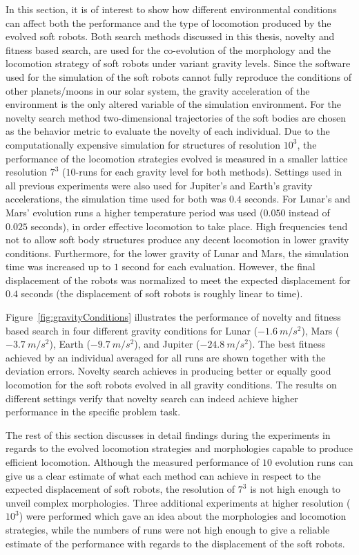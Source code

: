 In this section, it is of interest to show how different environmental conditions can affect both the performance and the type of locomotion produced by the evolved soft robots. Both search methods discussed in this thesis, novelty and fitness based search, are used for the co-evolution of the morphology and the locomotion strategy of soft robots under variant gravity levels. Since the software used for the simulation of the soft robots cannot fully reproduce the conditions of other planets/moons in our solar system, the gravity acceleration of the environment is the only altered variable of the simulation environment. For the novelty search method two-dimensional trajectories of the soft bodies are chosen as the behavior metric to evaluate the novelty of each individual. Due to the computationally expensive simulation for structures of resolution $10^3$, the performance of the locomotion strategies evolved is measured in a smaller lattice resolution $7^3$ ($10$-runs for each gravity level for both methods). Settings used in all previous experiments were also used for Jupiter's and Earth's gravity accelerations, the simulation time used for both was $0.4$ seconds. For Lunar's and Mars' evolution runs a higher temperature period was used ($0.050$ instead of $0.025$ seconds), in order effective locomotion to take place. High frequencies tend not to allow soft body structures produce any decent locomotion in lower gravity conditions. Furthermore, for the lower gravity of Lunar and Mars, the simulation time was increased up to $1$ second for each evaluation. However, the final displacement of the robots was normalized to meet the expected displacement for $0.4$ seconds (the displacement of soft robots is roughly linear to time).

Figure~\ref{fig:gravityConditions} illustrates the performance of novelty and fitness based search in four different gravity conditions for Lunar ($-1.6~m/s^2$), Mars ($-3.7~m/s^2$), Earth ($-9.7~m/s^2$), and Jupiter ($-24.8~m/s^2$). The best fitness achieved by an individual averaged for all runs are shown together with the deviation errors. Novelty search achieves in producing better or equally good locomotion for the soft robots evolved in all gravity conditions. The results on different settings verify that novelty search can indeed achieve higher performance in the specific problem task. 

The rest of this section discusses in detail findings during the experiments in regards to the evolved locomotion strategies and morphologies capable to produce efficient locomotion. Although the measured performance of $10$ evolution runs can give us a clear estimate of what each method can achieve in respect to the expected displacement of soft robots, the resolution of $7^3$ is not high enough to unveil complex morphologies. Three additional experiments at higher resolution ($10^3$) were performed which gave an idea  about the morphologies and locomotion strategies, while the numbers of runs were not high enough to give a reliable estimate of the performance with regards to the displacement of the soft robots.


